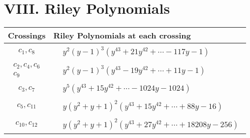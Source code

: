 \documentclass[1p]{elsarticle_modified}
\theoremstyle{definition}
\begin{document}
\centering \section*{ VIII. Riley Polynomials}
\begin{tabular}{m{50pt}|m{274pt}}
Crossings & \hspace{64pt}Riley Polynomials at each crossing \\
\hline $$\begin{aligned}c_{1},c_{8}\end{aligned}$$&$\begin{aligned}
&y^2(y-1)^3(y^{43}+21 y^{42}+\cdots-117 y-1)
\end{aligned}$\\
\hline $$\begin{aligned}c_{2},c_{4},c_{6}\\c_{9}\end{aligned}$$&$\begin{aligned}
&y^2(y-1)^3(y^{43}-19 y^{42}+\cdots+11 y-1)
\end{aligned}$\\
\hline $$\begin{aligned}c_{3},c_{7}\end{aligned}$$&$\begin{aligned}
&y^5(y^{43}+15 y^{42}+\cdots-1024 y-1024)
\end{aligned}$\\
\hline $$\begin{aligned}c_{5},c_{11}\end{aligned}$$&$\begin{aligned}
&y(y^2+y+1)^2(y^{43}+15 y^{42}+\cdots+88 y-16)
\end{aligned}$\\
\hline $$\begin{aligned}c_{10},c_{12}\end{aligned}$$&$\begin{aligned}
&y(y^2+y+1)^2(y^{43}+27 y^{42}+\cdots+18208 y-256)
\end{aligned}$\\
\hline
\end{tabular}
\vskip 2pc
\end{document}
